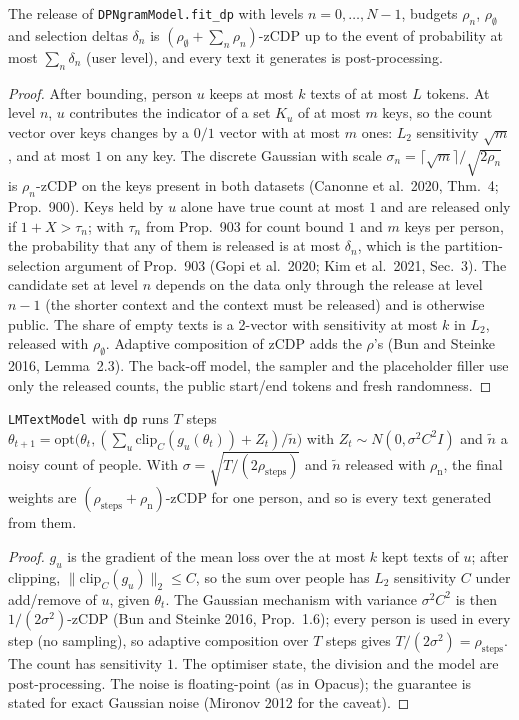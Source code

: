 \begin{proposition}\label{prop:txngram}
The release of \texttt{DPNgramModel.fit\_dp} with levels $n=0,\dots,N-1$, budgets $\rho_n$, $\rho_\emptyset$ and
selection deltas $\delta_n$ is $(\rho_\emptyset+\sum_n\rho_n)$-zCDP up to the event of probability at most
$\sum_n\delta_n$ (user level), and every text it generates is post-processing.
\end{proposition}
\begin{proof}
After bounding, person $u$ keeps at most $k$ texts of at most $L$ tokens. At level $n$, $u$ contributes the indicator
of a set $K_u$ of at most $m$ keys, so the count vector over keys changes by a $0/1$ vector with at most $m$ ones:
$L_2$ sensitivity $\sqrt m$, and at most $1$ on any key. The discrete Gaussian with scale
$\sigma_n=\lceil\sqrt m\rceil/\sqrt{2\rho_n}$ is $\rho_n$-zCDP on the keys present in both datasets
(Canonne et al.\ 2020, Thm.~4; Prop.~900). Keys held by $u$ alone have true count at most $1$ and are released only if
$1+X>\tau_n$; with $\tau_n$ from Prop.~903 for count bound $1$ and $m$ keys per person, the probability that any of
them is released is at most $\delta_n$, which is the partition-selection argument of Prop.~903 (Gopi et al.\ 2020;
Kim et al.\ 2021, Sec.~3). The candidate set at level $n$ depends on the data only through the release at level
$n-1$ (the shorter context and the context must be released) and is otherwise public. The share of empty texts is a
2-vector with sensitivity at most $k$ in $L_2$, released with $\rho_\emptyset$. Adaptive composition of zCDP adds the
$\rho$'s (Bun and Steinke 2016, Lemma~2.3). The back-off model, the sampler and the placeholder filler use only the
released counts, the public start/end tokens and fresh randomness.
\end{proof}

\begin{proposition}\label{prop:txdpgd}
\texttt{LMTextModel} with \texttt{dp} runs $T$ steps $\theta_{t+1}=\mathrm{opt}\big(\theta_t,(\sum_u
\mathrm{clip}_C(g_u(\theta_t))+Z_t)/\tilde n\big)$ with $Z_t\sim N(0,\sigma^2C^2I)$ and $\tilde n$ a noisy count of
people. With $\sigma=\sqrt{T/(2\rho_{\mathrm{steps}})}$ and $\tilde n$ released with $\rho_{\mathrm{n}}$, the final
weights are $(\rho_{\mathrm{steps}}+\rho_{\mathrm n})$-zCDP for one person, and so is every text generated from them.
\end{proposition}
\begin{proof}
$g_u$ is the gradient of the mean loss over the at most $k$ kept texts of $u$; after clipping,
$\|\mathrm{clip}_C(g_u)\|_2\le C$, so the sum over people has $L_2$ sensitivity $C$ under add/remove of $u$, given
$\theta_t$. The Gaussian mechanism with variance $\sigma^2C^2$ is then $1/(2\sigma^2)$-zCDP (Bun and Steinke 2016,
Prop.~1.6); every person is used in every step (no sampling), so adaptive composition over $T$ steps gives
$T/(2\sigma^2)=\rho_{\mathrm{steps}}$. The count has sensitivity $1$. The optimiser state, the division and the model
are post-processing. The noise is floating-point (as in Opacus); the guarantee is stated for exact Gaussian noise
(Mironov 2012 for the caveat).
\end{proof}


